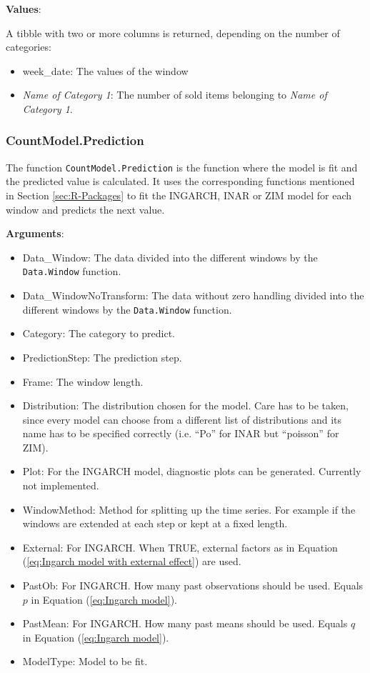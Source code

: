 \textbf{Values}:

A tibble with two or more columns is returned, depending on the number of categories: 

\begin{itemize}
	\item week\_date: The values of the window
	\item \textit{Name of Category 1}: The number of sold items belonging to \textit{Name of Category 1}.
\end{itemize}

\subsubsection{CountModel.Prediction}
\label{sec:CountModel.Prediction}

The function \texttt{CountModel.Prediction} is the function where the model is fit and the predicted value is calculated. It uses the corresponding functions mentioned in Section \ref{sec:R-Packages} to fit the INGARCH, INAR or ZIM model for each window and predicts the next value. 

\textbf{Arguments}:

\begin{itemize}
	\item Data\_Window: The data divided into the different windows by the \texttt{Data.Window} function.
	\item Data\_WindowNoTransform: The data without zero handling divided into the different windows by the \texttt{Data.Window} function.
  \item Category: The category to predict. 
  \item PredictionStep: The prediction step.
  \item Frame: The window length.
  \item Distribution: The distribution chosen for the model. Care has to be taken, since every model can choose from a different list of distributions and its name has to be specified correctly (i.e. "`Po"' for INAR but "`poisson"' for ZIM). 
  \item Plot: For the INGARCH model, diagnostic plots can be generated. Currently not implemented.
  \item WindowMethod: Method for splitting up the time series. For example if the windows are extended at each step or kept at a fixed length.
  \item External: For INGARCH. When TRUE, external factors as in Equation (\ref{eq:Ingarch model with external effect}) are used.
  \item PastOb: For INGARCH. How many past observations should be used. Equals $p$ in Equation (\ref{eq:Ingarch model}).
  \item PastMean: For INGARCH. How many past means should be used. Equals $q$ in Equation (\ref{eq:Ingarch model}).
  \item ModelType: Model to be fit. 
\end{itemize}

